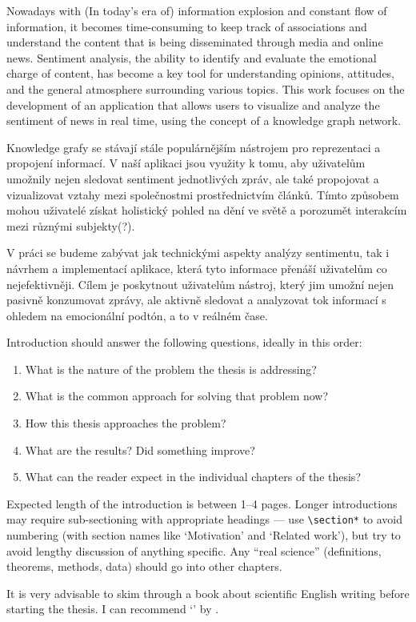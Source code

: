 

Nowadays with (In today's era of) information explosion and constant flow of information, it becomes time-consuming to keep track of associations and understand the content that is being disseminated through media and online news. Sentiment analysis, the ability to identify and evaluate the emotional charge of content, has become a key tool for understanding opinions, attitudes, and the general atmosphere surrounding various topics. This work focuses on the development of an application that allows users to visualize and analyze the sentiment of news in real time, using the concept of a knowledge graph network. 

Knowledge grafy se stávají stále populárnějším nástrojem pro reprezentaci a propojení informací. V naší aplikaci jsou využity k tomu, aby uživatelům umožnily nejen sledovat sentiment jednotlivých zpráv, ale také propojovat a vizualizovat vztahy mezi společnostmi prostřednictvím článků. Tímto způsobem mohou uživatelé získat holistický pohled na dění ve světě a porozumět interakcím mezi různými subjekty(?).

V práci se budeme zabývat jak technickými aspekty analýzy sentimentu, tak i návrhem a implementací aplikace, která tyto informace přenáší uživatelům co nejefektivněji. Cílem je poskytnout uživatelům nástroj, který jim umožní nejen pasivně konzumovat zprávy, ale aktivně sledovat a analyzovat tok informací s ohledem na emocionální podtón, a to v reálném čase.



Introduction should answer the following questions, ideally in this order:
\begin{enumerate}
\item What is the nature of the problem the thesis is addressing?
\item What is the common approach for solving that problem now?
\item How this thesis approaches the problem?
\item What are the results? Did something improve?
\item What can the reader expect in the individual chapters of the thesis?
\end{enumerate}

Expected length of the introduction is between 1--4 pages. Longer introductions may require sub-sectioning with appropriate headings --- use \texttt{\textbackslash{}section*} to avoid numbering (with section names like `Motivation' and `Related work'), but try to avoid lengthy discussion of anything specific. Any ``real science'' (definitions, theorems, methods, data) should go into other chapters.

It is very advisable to skim through a book about scientific English writing before starting the thesis. I can recommend `' by \citet{glasman2010science}.
